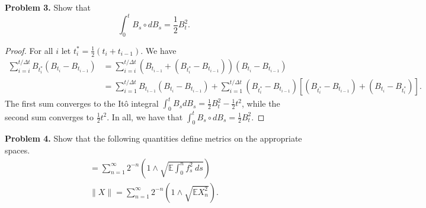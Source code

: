 \documentclass[11pt,letterpaper]{report}
\newcommand{\E}{\mathbb{E}}
\begin{document}
\noindent\textbf{Problem 3. }
Show that
\[
\int_0^tB_s\circ dB_s = \frac{1}{2}B_t^2.
\]
\begin{proof}
	For all $i$ let $t_i^* = \frac{1}{2}(t_i +t_{i-1})$. We have
	\begin{align*}
		\sum_{i = i}^{t/\Delta t}B_{t_i^*}(B_{t_i}-B_{t_{i-1}}) &= \sum_{i = i}^{t/\Delta t}(B_{t_{i-1}} + (B_{t_i^*}-B_{t_{i-1}}))(B_{t_i}-B_{t_{i-1}})\\
		&= \sum_{i=1}^{t/\Delta t}B_{t_{i-1}}(B_{t_i}-B_{t_{i-1}}) + \sum_{i=1}^{t/\Delta t}(B_{t_i^*} - B_{t_{i-1}})[(B_{t_i^*} - B_{t_{i-1}})+(B_{t_i} - B_{t_i^*})].
	\end{align*}
	The first sum converges to the It\^o integral $\int_0^tB_sdB_s = \frac{1}{2}B_t^2 - \frac{1}{2}t^2$, while the second sum converges to $\frac{1}{2}t^2$. In all, we have that $\int_0^tB_s\circ dB_s = \frac{1}{2}B_t^2$.
\end{proof}

\noindent\textbf{Problem 4. }
Show that the following quantities define metrics on the appropriate spaces.
\begin{gather*}
	[f] = \sum_{n=1}^\infty 2^{-n}\left( 1 \land \sqrt{\E\int_0^nf_s^2\ ds} \right)\\
	\|X\| = \sum_{n=1}^\infty 2^{-n}\left(1 \land \sqrt{\E X_n^2} \right).
\end{gather*}
\end{document}

